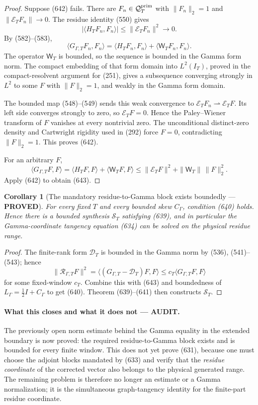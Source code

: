 \documentclass[11pt]{article}
\newtheorem{corollary}[theorem]{Corollary}
\newcommand{\PROVED}{\textcolor{green!45!black}{\textbf{PROVED}}}
\newcommand{\AUDIT}{\textcolor{orange!75!black}{\textbf{AUDIT}}}
\begin{document}
\begin{proof}
Suppose (642) fails.  There are \(F_n\in\mathcal Q_T^{\rm prim}\) with
\(\|F_n\|_2=1\) and \(\|\mathcal E_TF_n\|\to0\).  The residue identity
(550) gives
\[
 |\langle H_TF_n,F_n\rangle|
 \le\|\mathcal E_TF_n\|^2\longrightarrow0.
\]
By (582)--(583),
\[
 \langle G_{\Gamma,T}F_n,F_n\rangle
 =\langle H_TF_n,F_n\rangle+
   \langle\mathsf W_TF_n,F_n\rangle.
\]
The operator \(\mathsf W_T\) is bounded, so the sequence is bounded in the
Gamma form norm.  The compact embedding of that form domain into
\(L^2(I_T)\), proved in the compact-resolvent argument for (251), gives a
subsequence converging strongly in \(L^2\) to some \(F\) with
\(\|F\|_2=1\), and weakly in the Gamma form domain.

The bounded map (548)--(549) sends this weak convergence to
\(\mathcal E_TF_n\rightharpoonup\mathcal E_TF\).  Its left side converges
strongly to zero, so \(\mathcal E_TF=0\).  Hence the Paley--Wiener
transform of \(F\) vanishes at every nontrivial zero.  The unconditional
distinct-zero density and Cartwright rigidity used in (292) force
\(F=0\), contradicting \(\|F\|_2=1\).  This proves (642).

For an arbitrary \(F\),
\[
 \langle G_{\Gamma,T}F,F\rangle
 =\langle H_TF,F\rangle+\langle\mathsf W_TF,F\rangle
 \le\|\mathcal E_TF\|^2+\|\mathsf W_T\|\,\|F\|_2^2.
\]
Apply (642) to obtain (643).
\end{proof}

\begin{corollary}[The mandatory residue-to-Gamma block exists boundedly ---
\PROVED]
For every fixed \(T\) and every bounded skew \(C_\Gamma\), condition (640)
holds.  Hence there is a bounded synthesis \(\mathscr S_T\) satisfying
(639), and in particular the Gamma-coordinate tangency equation (634) can
be solved on the physical residue range.
\end{corollary}

\begin{proof}
The finite-rank form \(\mathcal D_T\) is bounded in the Gamma norm by
(536), (541)--(543); hence
\[
 \|\mathcal R_{\Gamma,T}F\|^2
 =\langle(G_{\Gamma,T}-\mathcal D_T)F,F\rangle
 \le c_T\langle G_{\Gamma,T}F,F\rangle
\]
for some fixed-window \(c_T\).  Combine this with (643) and boundedness of
\(L_\Gamma=\frac12I+C_\Gamma\) to get (640).  Theorem (639)--(641) then
constructs \(\mathscr S_T\).
\end{proof}

\paragraph{What this closes and what it does not --- \AUDIT.}
The previously open norm estimate behind the Gamma equality in the extended
boundary is now proved: the required residue-to-Gamma block exists and is
bounded for every finite window.  This does not yet prove (631), because
one must choose the adjoint blocks mandated by (633) and verify that the
\emph{residue coordinate} of the corrected vector also belongs to the
physical generated range.  The remaining problem is therefore no longer
an estimate or a Gamma normalization; it is the simultaneous graph-tangency
identity for the finite-part residue coordinate.
\end{document}
